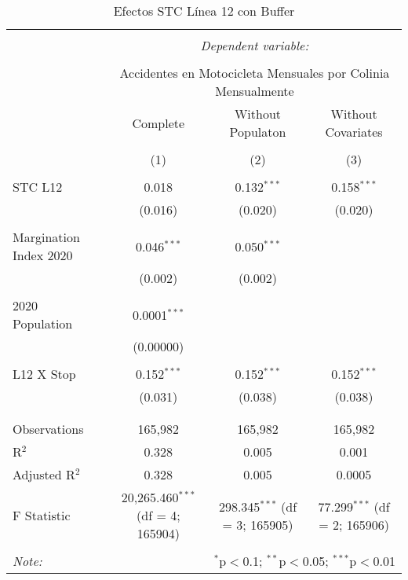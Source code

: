 
\begin{table}[!htbp] \centering 
  \caption{Efectos STC Línea 12 con Buffer} 
  \label{} 
\begin{tabular}{@{\extracolsep{5pt}}lccc} 
\\[-1.8ex]\hline 
\hline \\[-1.8ex] 
 & \multicolumn{3}{c}{\textit{Dependent variable:}} \\ 
\cline{2-4} 
\\[-1.8ex] & \multicolumn{3}{c}{Accidentes en Motocicleta Mensuales por Colinia Mensualmente} \\ 
 & Complete & Without Populaton & Without Covariates \\ 
\\[-1.8ex] & (1) & (2) & (3)\\ 
\hline \\[-1.8ex] 
 STC L12 & 0.018 & 0.132$^{***}$ & 0.158$^{***}$ \\ 
  & (0.016) & (0.020) & (0.020) \\ 
  & & & \\ 
 Margination Index 2020 & 0.046$^{***}$ & 0.050$^{***}$ &  \\ 
  & (0.002) & (0.002) &  \\ 
  & & & \\ 
 2020 Population & 0.0001$^{***}$ &  &  \\ 
  & (0.00000) &  &  \\ 
  & & & \\ 
 L12 X Stop & 0.152$^{***}$ & 0.152$^{***}$ & 0.152$^{***}$ \\ 
  & (0.031) & (0.038) & (0.038) \\ 
  & & & \\ 
\hline \\[-1.8ex] 
Observations & 165,982 & 165,982 & 165,982 \\ 
R$^{2}$ & 0.328 & 0.005 & 0.001 \\ 
Adjusted R$^{2}$ & 0.328 & 0.005 & 0.0005 \\ 
F Statistic & 20,265.460$^{***}$ (df = 4; 165904) & 298.345$^{***}$ (df = 3; 165905) & 77.299$^{***}$ (df = 2; 165906) \\ 
\hline 
\hline \\[-1.8ex] 
\textit{Note:}  & \multicolumn{3}{r}{$^{*}$p$<$0.1; $^{**}$p$<$0.05; $^{***}$p$<$0.01} \\ 
\end{tabular} 
\end{table} 
